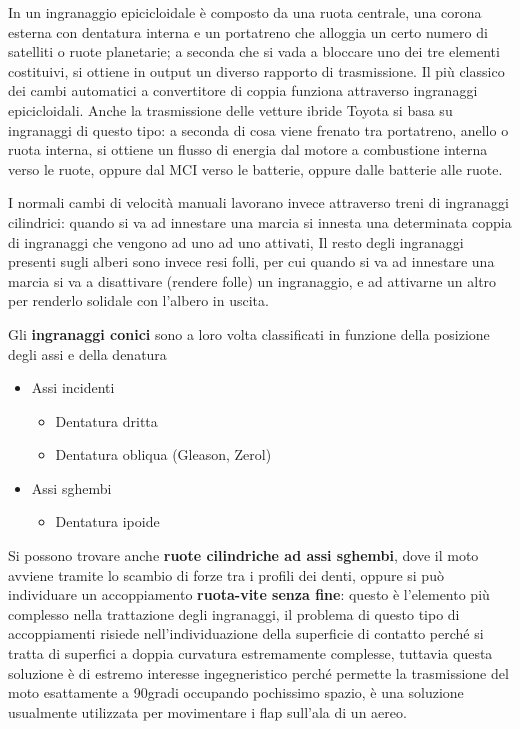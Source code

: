 \documentclass[a4paper, 15pt]{article}
\begin{document}
\begin{adjustwidth}{2in}{}
	In un ingranaggio epicicloidale è composto da una ruota centrale, una corona esterna con dentatura interna e un portatreno che alloggia un certo numero di satelliti o ruote planetarie; a seconda che si vada a bloccare uno dei tre elementi costituivi, si ottiene in output un diverso rapporto di trasmissione. Il più classico dei cambi automatici a convertitore di coppia funziona attraverso ingranaggi epicicloidali. Anche la trasmissione delle vetture ibride Toyota si basa su ingranaggi di questo tipo: a seconda di cosa viene frenato tra portatreno, anello o ruota interna, si ottiene un flusso di energia dal motore a combustione interna verso le ruote, oppure dal MCI verso le batterie, oppure dalle batterie alle ruote. 
	
	I normali cambi di velocità manuali lavorano invece attraverso treni di ingranaggi cilindrici: quando si va ad innestare una marcia si innesta una determinata coppia di ingranaggi che vengono ad uno ad uno attivati, Il resto degli ingranaggi presenti sugli alberi sono invece resi folli, per cui quando si va ad innestare una marcia si va a disattivare (rendere folle) un ingranaggio, e ad attivarne un altro per renderlo solidale con l'albero in uscita. \newline
	
	Gli \textbf{ingranaggi conici} sono a loro volta classificati in funzione della posizione degli assi e della denatura
	\begin{itemize}
		\item Assi incidenti
		\begin{itemize}
			\item Dentatura dritta
			\item Dentatura obliqua (Gleason, Zerol)
		\end{itemize}
		\item Assi sghembi
		\begin{itemize}
			\item Dentatura ipoide
		\end{itemize}
	\end{itemize}
	Si possono trovare anche \textbf{ruote cilindriche ad assi sghembi}, dove il moto avviene tramite lo scambio di forze tra i profili dei denti, oppure si può individuare un accoppiamento \textbf{ruota-vite senza fine}: questo è l'elemento più complesso nella trattazione degli ingranaggi, il problema di questo tipo di accoppiamenti risiede nell'individuazione della superficie di contatto perché si tratta di superfici a doppia curvatura estremamente complesse, tuttavia questa soluzione è di estremo interesse ingegneristico perché permette la trasmissione del moto esattamente a 90\degree gradi occupando pochissimo spazio, è una soluzione usualmente utilizzata per movimentare i flap sull'ala di un aereo. 
\end{adjustwidth}
\end{document}
